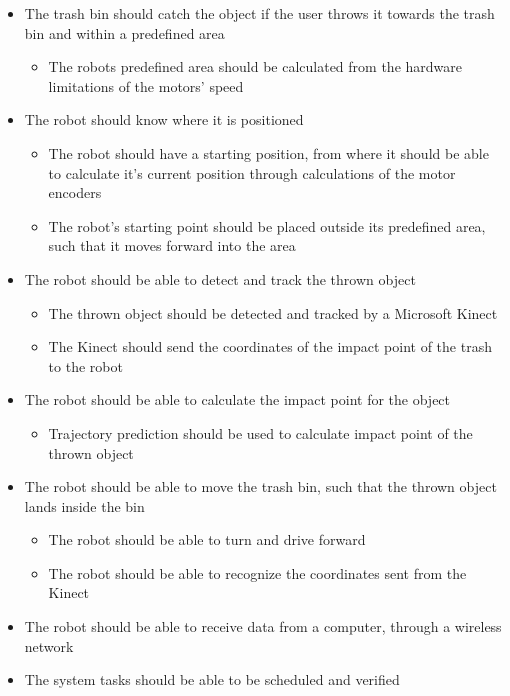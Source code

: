 \begin{itemize}
	\item The trash bin should catch the object if the user throws it towards the trash bin and within a predefined area
	\begin{itemize}
		\item {The robots predefined area should be calculated from the hardware limitations of the motors’ speed}
	\end{itemize}
	\item The robot should know where it is positioned
	\begin{itemize}
		\item {The robot should have a starting position, from where it should be able to calculate it's current position through calculations of the motor encoders}
		\item {The robot's starting point should be placed outside its predefined area, such that it moves forward into the area}
	\end{itemize}
	\item The robot should be able to detect and track the thrown object
	\begin{itemize}
		\item {The thrown object should be detected and tracked by a Microsoft Kinect}
		\item {The Kinect should send the coordinates of the impact point of the trash to the robot}
	\end{itemize}
	\item The robot should be able to calculate the impact point for the object
	\begin{itemize}
		\item {Trajectory prediction should be used to calculate impact point of the thrown object}
	\end{itemize}
	\item The robot should be able to move the trash bin, such that the thrown object lands inside the bin
	\begin{itemize}
		\item {The robot should be able to turn and drive forward}
		\item{The robot should be able to recognize the coordinates sent from the Kinect}
	\end{itemize}
	\item {The robot should be able to receive data from a computer, through a wireless network}
	\item {The system tasks should be able to be scheduled and verified}
\end{itemize}


